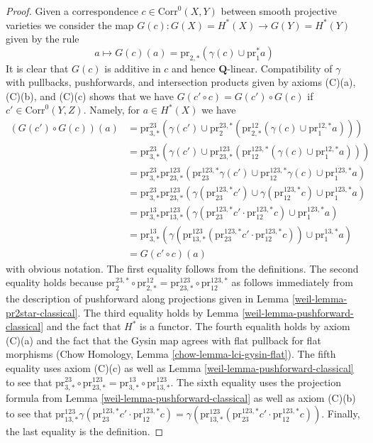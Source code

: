 \begin{proof}
\medskip\noindent
Given a correspondence $c \in \text{Corr}^0(X, Y)$ between smooth
projective varieties we consider the map
$G(c) : G(X) = H^*(X) \to G(Y) = H^*(Y)$ given by the rule
$$
a \longmapsto
G(c)(a) = \text{pr}_{2, *}(\gamma(c) \cup \text{pr}_1^*a)
$$
It is clear that $G(c)$ is additive in $c$ and hence $\mathbf{Q}$-linear.
Compatibility of $\gamma$ with pullbacks, pushforwards, and
intersection products given by axioms (C)(a), (C)(b), and (C)(c)
shows that we have
$G(c' \circ c) = G(c') \circ G(c)$ if $c' \in \text{Corr}^0(Y, Z)$.
Namely, for $a \in H^*(X)$ we have
\begin{align*}
(G(c') \circ G(c))(a)
& =
\text{pr}^{23}_{3, *}(\gamma(c') \cup
\text{pr}^{23, *}_2(\text{pr}^{12}_{2, *}(\gamma(c) \cup
\text{pr}^{12, *}_1a))) \\
& =
\text{pr}^{23}_{3, *}(\gamma(c') \cup
\text{pr}^{123}_{23, *}(\text{pr}^{123, *}_{12}(\gamma(c) \cup
\text{pr}^{12, *}_1 a))) \\
& =
\text{pr}^{23}_{3, *}
\text{pr}^{123}_{23, *}(
\text{pr}^{123, *}_{23}\gamma(c') \cup
\text{pr}^{123, *}_{12}\gamma(c) \cup
\text{pr}^{123, *}_1 a) \\
& =
\text{pr}^{23}_{3, *}
\text{pr}^{123}_{23, *}(
\gamma(\text{pr}^{123, *}_{23}c') \cup
\gamma(\text{pr}^{123, *}_{12}c) \cup
\text{pr}^{123, *}_1 a) \\
& =
\text{pr}^{13}_{3, *}
\text{pr}^{123}_{13, *}(
\gamma(\text{pr}^{123, *}_{23}c' \cdot \text{pr}^{123, *}_{12}c) \cup
\text{pr}^{123, *}_1 a) \\
& =
\text{pr}^{13}_{3, *}(
\gamma(\text{pr}^{123}_{13, *}(
\text{pr}^{123, *}_{23}c' \cdot \text{pr}^{123, *}_{12}c)) \cup
\text{pr}^{13, *}_1 a) \\
& =
G(c' \circ c)(a)
\end{align*}
with obvious notation. The first equality follows from the definitions.
The second equality holds because
$\text{pr}^{23, *}_2 \circ \text{pr}^{12}_{2, *} =
\text{pr}^{123}_{23, *} \circ \text{pr}^{123, *}_{12}$
as follows immediately from the description of pushforward
along projections given in Lemma \ref{weil-lemma-pr2star-classical}.
The third equality holds by Lemma \ref{weil-lemma-pushforward-classical}
and the fact that $H^*$ is a functor.
The fourth equalith holds by axiom (C)(a) and the fact that
the Gysin map agrees with flat pullback for flat morphisms
(Chow Homology, Lemma \ref{chow-lemma-lci-gysin-flat}).
The fifth equality uses axiom (C)(c) as well as
Lemma \ref{weil-lemma-pushforward-classical} to see that
$\text{pr}^{23}_{3, *} \circ \text{pr}^{123}_{23, *} =
\text{pr}^{13}_{3, *} \circ \text{pr}^{123}_{13, *}$.
The sixth equality uses the projection formula from
Lemma \ref{weil-lemma-pushforward-classical} as well as
axiom (C)(b) to see that $
\text{pr}^{123}_{13, *}
\gamma(\text{pr}^{123, *}_{23}c' \cdot \text{pr}^{123, *}_{12}c) =
\gamma(\text{pr}^{123}_{13, *}(
\text{pr}^{123, *}_{23}c' \cdot \text{pr}^{123, *}_{12}c))$.
Finally, the last equality is the definition.


\end{proof}
